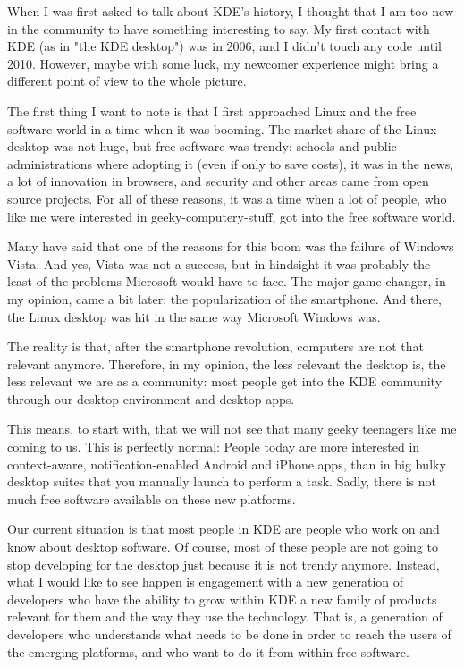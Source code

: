 

\noindent{}When I was first asked to talk about KDE’s history, I thought that I am too new in the community to have something interesting to say. My first contact with KDE (as in "the KDE desktop") was in 2006, and I didn’t touch any code until 2010. However, maybe with some luck, my newcomer experience might bring a different point of view to the whole picture.

The first thing I want to note is that I first approached Linux and the free software world in a time when it was booming. The market share of the Linux desktop was not huge, but free software was trendy: schools and public administrations where adopting it (even if only to save costs), it was in the news, a lot of innovation in browsers, and security and other areas came from open source projects. For all of these reasons, it was a time when a lot of people, who like me were interested in geeky-computery-stuff, got into the free software world.

Many have said that one of the reasons for this boom was the failure of Windows Vista. And yes, Vista was not a success, but in hindsight it was probably the least of the problems Microsoft would have to face. The major game changer, in my opinion, came a bit later: the popularization of the smartphone. And there, the Linux desktop was hit in the same way Microsoft Windows was.

The reality is that, after the smartphone revolution, computers are not that relevant anymore. Therefore, in my opinion, the less relevant the desktop is, the less relevant we are as a community: most people get into the KDE community through our desktop environment and desktop apps. 

This means, to start with, that we will not see that many geeky teenagers like me coming to us. This is perfectly normal: People today are more interested in context-aware, notification-enabled Android and iPhone apps, than in big bulky desktop suites that you manually launch to perform a task. Sadly, there is not much free software available on these new platforms.

Our current situation is that most people in KDE are people who work on and know about desktop software. Of course, most of these people are not going to stop developing for the desktop just because it is not trendy anymore. Instead, what I would like to see happen is engagement with a new generation of developers who have the ability to grow within KDE a new family of products relevant for them and the way they use the technology. That is, a generation of developers who understands what needs to be done in order to reach the users of the emerging platforms, and who want to do it from within free software.

